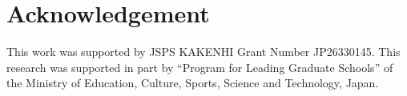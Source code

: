 \documentclass[conference]{IEEEtran}
\begin{document}







\section*{Acknowledgement}
This work was supported by JSPS KAKENHI Grant Number JP26330145. This research
was supported in part by ``Program for Leading Graduate Schools'' of the
Ministry of Education, Culture, Sports, Science and Technology, Japan.

\printbibliography[heading=bibintoc,title={References}]

\par\leavevmode
\end{document}
